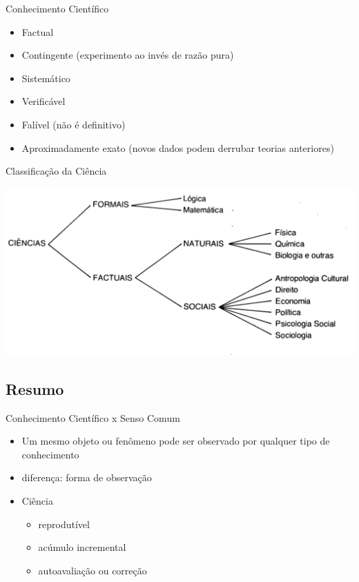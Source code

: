 \documentclass{beamer}
\begin{document}
\begin{frame}{Conhecimento Científico}
  \begin{itemize}
  \item Factual
  \item Contingente (\alert{experimento} ao invés de razão pura)
  \item Sistemático 
  \item \alert{Verificável}
  \item Falível (não é definitivo)
  \item Aproximadamente exato (novos dados podem derrubar teorias
    anteriores)
  \end{itemize}
\end{frame}

\begin{frame}{Classificação da Ciência}
  \begin{center}
    \includegraphics[width=\textwidth]{Intro/ciencias}
  \end{center}
\end{frame}


\subsection{Resumo}

\begin{frame}{Conhecimento Científico x Senso Comum}
  \begin{itemize}
  \item Um mesmo objeto ou fenômeno \alert{pode} ser observado por
    qualquer tipo de conhecimento
  \item diferença: forma de observação
  \item Ciência
    \begin{itemize}
    \item reprodutível
    \item acúmulo incremental
    \item autoavaliação ou correção
    \end{itemize}
  \end{itemize}
\end{frame}
\end{document}
